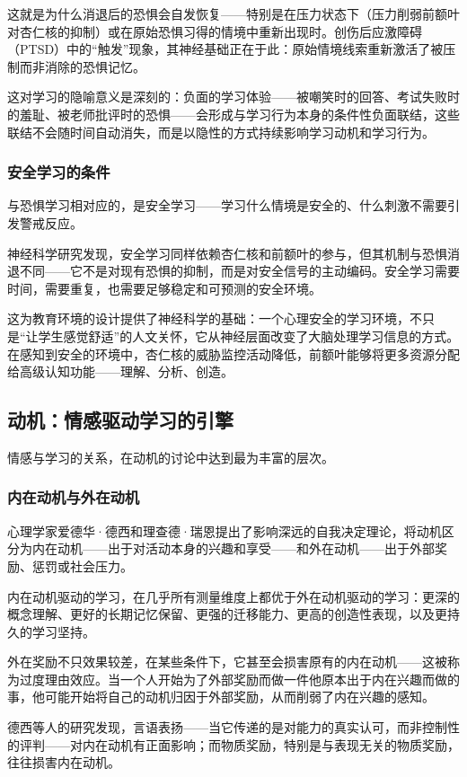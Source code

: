 \documentclass[11pt]{article}
\begin{document}
这就是为什么消退后的恐惧会自发恢复——特别是在压力状态下（压力削弱前额叶对杏仁核的抑制）或在原始恐惧习得的情境中重新出现时。创伤后应激障碍（PTSD）中的“触发”现象，其神经基础正在于此：原始情境线索重新激活了被压制而非消除的恐惧记忆。

这对学习的隐喻意义是深刻的：负面的学习体验——被嘲笑时的回答、考试失败时的羞耻、被老师批评时的恐惧——会形成与学习行为本身的条件性负面联结，这些联结不会随时间自动消失，而是以隐性的方式持续影响学习动机和学习行为。
\subsubsection{安全学习的条件}
\label{sec:org124b4ca}

与恐惧学习相对应的，是安全学习——学习什么情境是安全的、什么刺激不需要引发警戒反应。

神经科学研究发现，安全学习同样依赖杏仁核和前额叶的参与，但其机制与恐惧消退不同——它不是对现有恐惧的抑制，而是对安全信号的主动编码。安全学习需要时间，需要重复，也需要足够稳定和可预测的安全环境。

这为教育环境的设计提供了神经科学的基础：一个心理安全的学习环境，不只是“让学生感觉舒适”的人文关怀，它从神经层面改变了大脑处理学习信息的方式。在感知到安全的环境中，杏仁核的威胁监控活动降低，前额叶能够将更多资源分配给高级认知功能——理解、分析、创造。
\subsection{动机：情感驱动学习的引擎}
\label{sec:orgb8c4cfe}

情感与学习的关系，在动机的讨论中达到最为丰富的层次。
\subsubsection{内在动机与外在动机}
\label{sec:org5fe864e}

心理学家爱德华·德西和理查德·瑞恩提出了影响深远的自我决定理论，将动机区分为内在动机——出于对活动本身的兴趣和享受——和外在动机——出于外部奖励、惩罚或社会压力。

内在动机驱动的学习，在几乎所有测量维度上都优于外在动机驱动的学习：更深的概念理解、更好的长期记忆保留、更强的迁移能力、更高的创造性表现，以及更持久的学习坚持。

外在奖励不只效果较差，在某些条件下，它甚至会损害原有的内在动机——这被称为过度理由效应。当一个人开始为了外部奖励而做一件他原本出于内在兴趣而做的事，他可能开始将自己的动机归因于外部奖励，从而削弱了内在兴趣的感知。

德西等人的研究发现，言语表扬——当它传递的是对能力的真实认可，而非控制性的评判——对内在动机有正面影响；而物质奖励，特别是与表现无关的物质奖励，往往损害内在动机。
\end{document}
